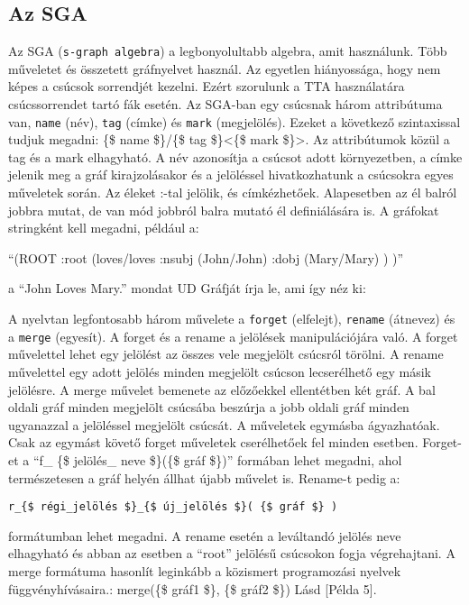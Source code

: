 \subsection{Az SGA}
Az SGA (\texttt{s-graph algebra}) a legbonyolultabb algebra, amit használunk. Több műveletet és összetett gráfnyelvet használ. Az egyetlen hiányossága, hogy nem képes a csúcsok sorrendjét kezelni. Ezért szorulunk a TTA használatára csúcssorrendet tartó fák esetén. Az SGA-ban egy csúcsnak három attribútuma van, \texttt{name} (név), \texttt{tag} (címke) és \texttt{mark} (megjelölés). Ezeket a következő szintaxissal tudjuk megadni: \{\$ name \$\}/\{\$ tag \$\}<\{\$ mark \$\}>. Az attribútumok közül a tag és a mark elhagyható. A név azonosítja a csúcsot adott környezetben, a címke jelenik meg a gráf kirajzolásakor és a jelöléssel hivatkozhatunk a csúcsokra egyes műveletek során. Az éleket :-tal jelölik, és címkézhetőek. Alapesetben az él balról jobbra mutat, de van mód jobbról balra mutató él definiálására is. A gráfokat stringként kell megadni, például a:

“(ROOT :root (loves/loves :nsubj (John/John) :dobj (Mary/Mary) ) )”

a “John Loves Mary.” mondat UD Gráfját írja le, ami így néz ki:


A nyelvtan legfontosabb három művelete a \texttt{forget} (elfelejt), \texttt{rename} (átnevez) és a \texttt{merge} (egyesít). A forget és a rename a jelölések manipulációjára való. A forget művelettel lehet egy jelölést az összes vele megjelölt csúcsról törölni. A rename művelettel egy adott jelölés minden megjelölt csúcson lecserélhető egy másik jelölésre. A merge művelet bemenete az előzőekkel ellentétben két gráf. A bal oldali gráf minden megjelölt csúcsába beszúrja a jobb oldali gráf minden ugyanazzal a jelöléssel megjelölt csúcsát. A műveletek egymásba ágyazhatóak. Csak az egymást követő forget műveletek cserélhetőek fel minden esetben. Forget-et a “f\_ \{\$ jelölés\_ neve \$\}(\{\$ gráf \$\})”
 formában lehet megadni, ahol természetesen a gráf helyén állhat újabb művelet is.  Rename-t pedig a:
\begin{verbatim}
r_{$ régi_jelölés $}_{$ új_jelölés $}( {$ gráf $} )
\end{verbatim}
formátumban lehet megadni. A rename esetén a leváltandó jelölés neve elhagyható és abban az esetben a “root” jelölésű csúcsokon fogja végrehajtani. A merge formátuma hasonlít leginkább a közismert programozási nyelvek függvényhívásaira.: merge(\{\$ gráf1 \$\}, \{\$ gráf2 \$\}) Lásd [Példa 5].

